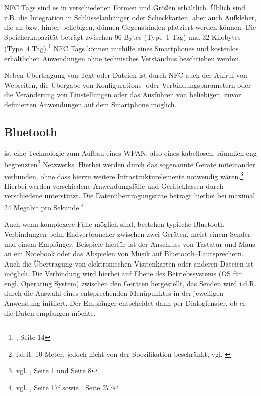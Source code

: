 NFC Tags sind es in verschiedenen Formen und Größen erhältlich. Üblich sind z.B. die Integration in Schlüsselanhänger oder Scheckkarten, aber auch Aufkleber, die an bzw. hinter beliebigen, dünnen Gegenständen platziert werden können. Die Speicherkapazität beträgt zwischen 96 Bytes (Type~1 Tag) und 32 Kilobytes (Type~4 Tag).\footnote{\cite{nfcforum:spec}, Seite 14} NFC Tags können mithilfe eines Smartphones und kostenlos erhältlichen Anwendungen ohne technisches Verständnis beschrieben werden.

Neben Übertragung von Text oder Dateien ist durch NFC auch der Aufruf von Webseiten, die Übergabe von Konfigurations- oder Verbindungsparametern oder die Veränderung von Einstellungen oder das Ausführen von beliebigen, zuvor definierten Anwendungen auf dem Smartphone möglich.


\subsection{Bluetooth} %
\label{sub:bluetooth}

 ist eine Technologie zum Aufbau eines \ac{WPAN}, also eines kabellosen, räumlich eng begrenzten\footnote{i.d.R. 10 Meter, jedoch nicht von der Spezifikation beschränkt, vgl. \cite{bluetooth:smart}} Netzwerks. Hierbei werden durch das sogenannte  Geräte miteinander verbunden, ohne dass hierzu weitere Infrastrukturelemente notwendig wären.\footnote{vgl. \cite{bluetooth:spec}, Seite 1 und Seite 8} Hierbei werden verschiedene Anwendungsfälle und Geräteklassen durch verschiedene  unterstützt.  Die Datenübertragungsrate beträgt hierbei bei maximal 24 Megabit pro Sekunde.\footnote{vgl. \cite{bluetooth:sigv1}, Seite 17f sowie \cite{bluetooth:sigv3}, Seite 277}

Auch wenn komplexere Fälle möglich sind, bestehen typische Bluetooth–Verbindungen beim Endverbraucher zwischen zwei Geräten, meist einem Sender und einem Empfänger. Beispiele hierfür ist der Anschluss von Tastatur und Maus an ein Notebook oder das Abspielen von Musik auf Bluetooth–Lautsprechern. Auch die Übertragung von elektronischen Visitenkarten oder anderen Dateien ist möglich. Die Verbindung wird hierbei auf Ebene des Betriebssystems  (\ac{OS} für engl. Operating System) zwischen den Geräten hergestellt, das Senden wird i.d.R. durch die Auswahl eines entsprechenden Menüpunktes in der jeweiligen Anwendung initiiert. Der Empfänger entscheidet dann per Dialogfenster, ob er die Daten empfangen möchte.


